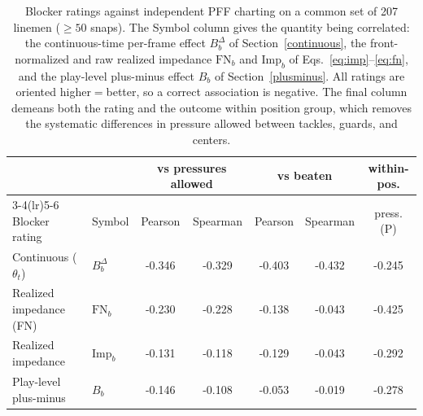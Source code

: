 \begin{table}[h!]
\centering
\footnotesize
\begin{tabular}{llccccc}
\toprule
 & & \multicolumn{2}{c}{vs pressures allowed} & \multicolumn{2}{c}{vs beaten} & within-pos. \\
\cmidrule(lr){3-4}\cmidrule(lr){5-6}
Blocker rating & Symbol & Pearson & Spearman & Pearson & Spearman & press. (P) \\
\midrule
Continuous ($\theta_t$) & $B^{\Delta}_b$ & -0.346 & -0.329 & -0.403 & -0.432 & -0.245 \\
Realized impedance (FN) & $\mathrm{FN}_b$ & -0.230 & -0.228 & -0.138 & -0.043 & -0.425 \\
Realized impedance & $\mathrm{Imp}_b$ & -0.131 & -0.118 & -0.129 & -0.043 & -0.292 \\
Play-level plus-minus & $B_b$ & -0.146 & -0.108 & -0.053 & -0.019 & -0.278 \\
\bottomrule
\end{tabular}
\caption{Blocker ratings against independent PFF charting on a common set of 207 linemen ($\geq 50$ snaps). The Symbol column gives the quantity being correlated: the continuous-time per-frame effect $B^{\Delta}_b$ of Section~\ref{continuous}, the front-normalized and raw realized impedance $\mathrm{FN}_b$ and $\mathrm{Imp}_b$ of Eqs.~\ref{eq:imp}--\ref{eq:fn}, and the play-level plus-minus effect $B_b$ of Section~\ref{plusminus}. All ratings are oriented higher${=}$better, so a correct association is negative. The final column demeans both the rating and the outcome within position group, which removes the systematic differences in pressure allowed between tackles, guards, and centers.}
\label{tab:blocker_cont_vs_play}
\end{table}
